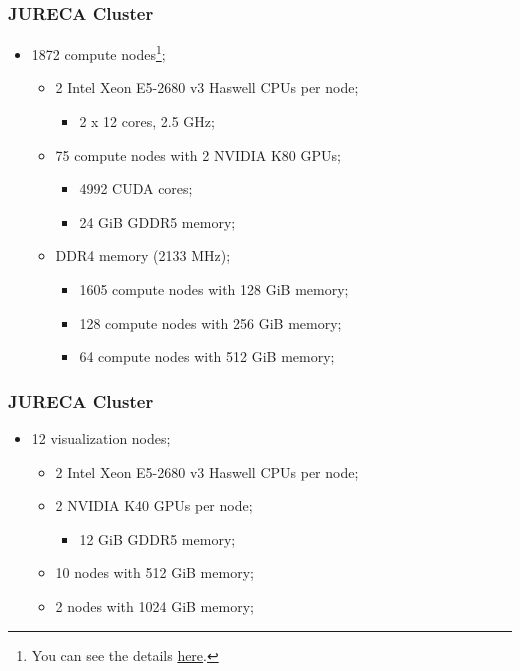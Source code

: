 \documentclass{beamer}
\begin{document}
\begin{frame}
  \frametitle{JURECA Cluster}
  \begin{itemize}
    \item 1872 compute nodes\footnote{You can see the details \href{https://www.fz-juelich.de/ias/jsc/EN/Expertise/Supercomputers/JURECA/Configuration/Configuration_node.html}{here}.};
          \begin{itemize}
            \item 2 Intel Xeon E5-2680 v3 Haswell CPUs per node;
                  \begin{itemize}
                    \item 2 x 12 cores, 2.5 GHz;
                  \end{itemize}
            \item 75 compute nodes with 2 NVIDIA K80 GPUs;
                  \begin{itemize}
                    \item 4992 CUDA cores;
                    \item 24 GiB GDDR5 memory;
                  \end{itemize}
            \item DDR4 memory (2133 MHz);
                  \begin{itemize}
                    \item 1605 compute nodes with 128 GiB memory;
                    \item 128 compute nodes with 256 GiB memory;
                    \item 64 compute nodes with 512 GiB memory;
                  \end{itemize}
          \end{itemize}
  \end{itemize}
\end{frame}

\begin{frame}
  \frametitle{JURECA Cluster}
  \begin{itemize}
    \item 12 visualization nodes;
          \begin{itemize}
            \item 2 Intel Xeon E5-2680 v3 Haswell CPUs per node;
            \item 2 NVIDIA K40 GPUs per node;
                  \begin{itemize}
                    \item 12 GiB GDDR5 memory;
                  \end{itemize}
            \item 10 nodes with 512 GiB memory;
            \item 2 nodes with 1024 GiB memory;
          \end{itemize}
  \end{itemize}
\end{frame}
\end{document}
